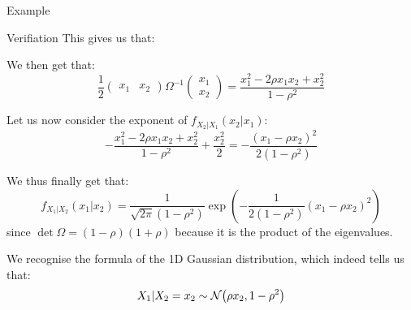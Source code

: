 \documentclass[a4paper]{article}
\begin{document}
\begin{parag}{Example}
\begin{subparag}{Verifiation}
        This gives us that: 
        
        We then get that: 
        \[\frac{1}{2}\begin{pmatrix} x_1 & x_2 \end{pmatrix} \Omega^{-1} \begin{pmatrix} x_1 \\ x_2 \end{pmatrix} = \frac{x_1^2  - 2\rho x_1 x_2 + x_2^2}{1 - \rho^2} \]

        Let us now consider the exponent of $f_{X_2|X_1}\left(x_2|x_1\right)$: 
        \[-\frac{x_1^2  - 2\rho x_1 x_2 + x_2^2}{1 - \rho^2} + \frac{x_2^2}{2} = -\frac{\left(x_1 - \rho x_2\right)^2}{2\left(1 - \rho^2\right)}\]
        
        We thus finally get that: 
        \[f_{X_1|X_2}\left(x_1|x_2\right) = \frac{1}{\sqrt{2\pi} \left(1 - \rho^2\right)} \exp\left(-\frac{1}{2\left(1 - \rho^2\right)}\left(x_1 - \rho x_2\right)^2\right)\]
        since $\det \Omega = \left(1 - \rho\right)\left(1 + \rho\right)$ because it is the product of the eigenvalues.

        We recognise the formula of the 1D Gaussian distribution, which indeed tells us that:
        \[X_1 | X_2 = x_2 \followsdistr \mathcal{N}\left(\rho x_2, 1- \rho^2\right)\]
        
    \end{subparag}
\end{parag}
\end{document}
